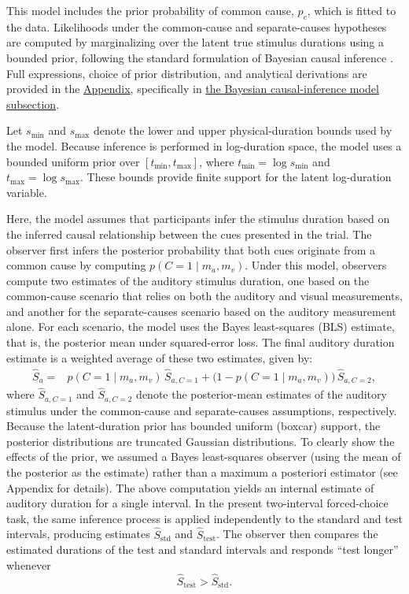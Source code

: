 \documentclass{jov}
\providecommand{\citep}[1]{\cite{#1}}
\begin{document}
This model includes the prior probability of common cause, $p_c$, which is fitted to the data. Likelihoods under the common-cause and separate-causes hypotheses are computed by marginalizing over the latent true stimulus durations using a bounded prior, following the standard formulation of Bayesian causal inference \citep{kording2007causal}. Full expressions, choice of prior distribution, and analytical derivations are provided in the \hyperref[app:appendix]{Appendix}, specifically in \hyperref[causal_inf_equations]{the Bayesian causal-inference model subsection}.

Let $s_{\min}$ and $s_{\max}$ denote the lower and upper physical-duration bounds used by the model. Because inference is performed in log-duration space, the model uses a bounded uniform prior over $[t_{\min},t_{\max}]$, where $t_{\min}=\log s_{\min}$ and $t_{\max}=\log s_{\max}$. These bounds provide finite support for the latent log-duration variable.

Here, the model assumes that participants infer the stimulus duration based on the inferred causal relationship between the cues presented in the trial. The observer first infers the posterior probability that both cues originate from a common cause by computing $p(C = 1 \mid m_a, m_v)$. Under this model, observers compute two estimates of the auditory stimulus duration, one based on the common-cause scenario that relies on both the auditory and visual measurements, and another for the separate-causes scenario based on the auditory measurement alone. For each scenario, the model uses the Bayes least-squares (BLS) estimate, that is, the posterior mean under squared-error loss. The final auditory duration estimate is a weighted average of these two estimates, given by:
\begin{align}
\hat S_{a}
= {}& p(C=1 \mid m_a,m_v)\,\hat S_{a,C=1}
+ \bigl(1 - p(C=1 \mid m_a,m_v)\bigr)\,
   \hat S_{a,C=2},
\label{eq:estimate_model_avg}
\end{align}
where $\hat S_{a,C=1}$ and $\hat S_{a,C=2}$ denote the posterior-mean estimates of the auditory stimulus under the common-cause and separate-causes assumptions, respectively. Because the latent-duration prior has bounded uniform (boxcar) support, the posterior distributions are truncated Gaussian distributions. To clearly show the effects of the prior, we assumed a Bayes least-squares observer (using the mean of the posterior as the estimate) rather than a maximum a posteriori estimator (see Appendix for details).
The above computation yields an internal estimate of auditory duration for a single interval. In the present two-interval forced-choice task, the same inference process is applied independently to the standard and test intervals, producing estimates $\hat S_{\mathrm{std}}$ and $\hat S_{\mathrm{test}}$. The observer then compares the estimated durations of the test and standard intervals and responds ``test longer'' whenever
\begin{equation}
\hat S_{\mathrm{test}} > \hat S_{\mathrm{std}}.
\end{equation}
\end{document}

